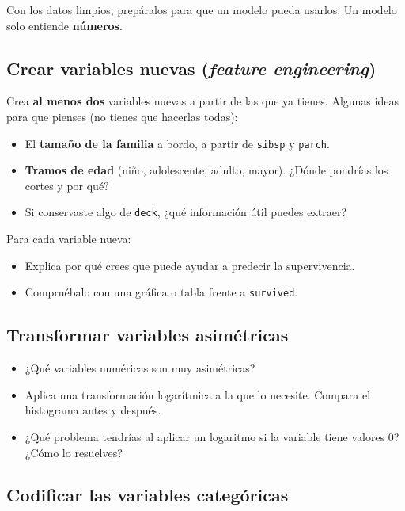 \documentclass[11pt,a4paper]{article}
\newcommand{\col}[1]{\texttt{#1}}
\begin{document}
Con los datos limpios, prepáralos para que un modelo pueda usarlos. Un modelo solo
entiende \textbf{números}.

\subsection{Crear variables nuevas (\emph{feature engineering})}

Crea \textbf{al menos dos} variables nuevas a partir de las que ya tienes. Algunas ideas
para que pienses (no tienes que hacerlas todas):
\begin{itemize}
  \item El \textbf{tamaño de la familia} a bordo, a partir de \col{sibsp} y \col{parch}.
  \item \textbf{Tramos de edad} (niño, adolescente, adulto, mayor). ¿Dónde pondrías los
        cortes y por qué?
  \item Si conservaste algo de \col{deck}, ¿qué información útil puedes extraer?
\end{itemize}
Para cada variable nueva:
\begin{itemize}
  \item Explica por qué crees que puede ayudar a predecir la supervivencia.
  \item Compruébalo con una gráfica o tabla frente a \col{survived}.
\end{itemize}

\subsection{Transformar variables asimétricas}
\begin{itemize}
  \item ¿Qué variables numéricas son muy asimétricas?
  \item Aplica una transformación logarítmica a la que lo necesite. Compara el histograma
        antes y después.
  \item ¿Qué problema tendrías al aplicar un logaritmo si la variable tiene valores 0?
        ¿Cómo lo resuelves?
\end{itemize}

\subsection{Codificar las variables categóricas}
\end{document}
